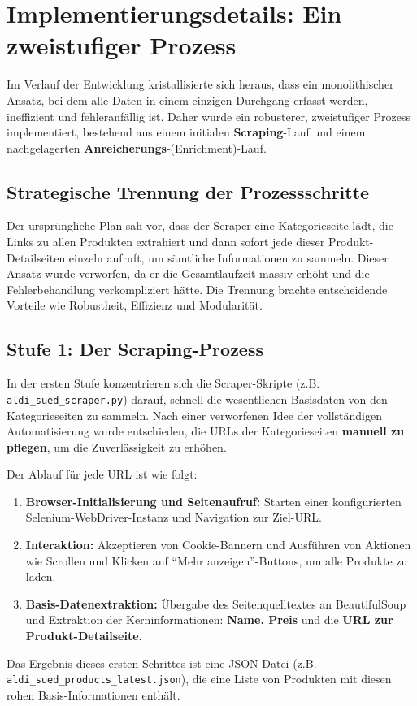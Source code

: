\documentclass[12pt, a4paper]{report} %
\begin{document}
\section{Implementierungsdetails: Ein zweistufiger Prozess}
\label{sec:scraping_prozess}
Im Verlauf der Entwicklung kristallisierte sich heraus, dass ein monolithischer Ansatz, bei dem alle Daten in einem einzigen Durchgang erfasst werden, ineffizient und fehleranfällig ist. Daher wurde ein robusterer, zweistufiger Prozess implementiert, bestehend aus einem initialen \textbf{Scraping}-Lauf und einem nachgelagerten \textbf{Anreicherungs}-(Enrichment)-Lauf.

\subsection{Strategische Trennung der Prozessschritte}
Der ursprüngliche Plan sah vor, dass der Scraper eine Kategorieseite lädt, die Links zu allen Produkten extrahiert und dann sofort jede dieser Produkt-Detailseiten einzeln aufruft, um sämtliche Informationen zu sammeln. Dieser Ansatz wurde verworfen, da er die Gesamtlaufzeit massiv erhöht und die Fehlerbehandlung verkompliziert hätte. Die Trennung brachte entscheidende Vorteile wie Robustheit, Effizienz und Modularität.

\subsection{Stufe 1: Der Scraping-Prozess}
In der ersten Stufe konzentrieren sich die Scraper-Skripte (z.B. \texttt{aldi\_sued\_scraper.py}) darauf, schnell die wesentlichen Basisdaten von den Kategorieseiten zu sammeln. Nach einer verworfenen Idee der vollständigen Automatisierung wurde entschieden, die URLs der Kategorieseiten \textbf{manuell zu pflegen}, um die Zuverlässigkeit zu erhöhen.

Der Ablauf für jede URL ist wie folgt:
\begin{enumerate}
    \item \textbf{Browser-Initialisierung und Seitenaufruf:} Starten einer konfigurierten Selenium-WebDriver-Instanz und Navigation zur Ziel-URL.
    \item \textbf{Interaktion:} Akzeptieren von Cookie-Bannern und Ausführen von Aktionen wie Scrollen und Klicken auf "`Mehr anzeigen"'-Buttons, um alle Produkte zu laden.
    \item \textbf{Basis-Datenextraktion:} Übergabe des Seitenquelltextes an BeautifulSoup und Extraktion der Kerninformationen: \textbf{Name, Preis} und die \textbf{URL zur Produkt-Detailseite}.
\end{enumerate}
Das Ergebnis dieses ersten Schrittes ist eine JSON-Datei (z.B. \texttt{aldi\_sued\_products\_latest.json}), die eine Liste von Produkten mit diesen rohen Basis-Informationen enthält.
\end{document}
